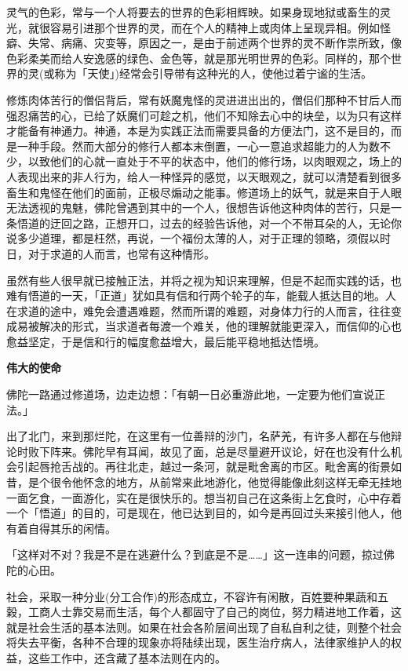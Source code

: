 \documentclass[twoside,openany]{book}
\newcommand{\mt}[1]{\textbullet \textbf{#1}}
\begin{document}
灵气的色彩，常与一个人将要去的世界的色彩相辉映。如果身现地狱或畜生的灵光，就很容易引进那个世界的灵，而在个人的精神上或肉体上呈现异相。例如怪癖、失常、病痛、灾变等，原因之一，是由于前述两个世界的灵不断作祟所致，像色彩柔美而给人安逸感的绿色、金色等，就是那光明世界的色彩。同样的，那个世界的灵(或称为「天使」)经常会引导带有这种光的人，使他过着宁谧的生活。

修炼肉体苦行的僧侣背后，常有妖魔鬼怪的灵进进出出的，僧侣们那种不甘后人而强忍痛苦的心，已给了妖魔们可趁之机，他们不知除去心中的块垒，以为只有这样才能备有神通力。神通，本是为实践正法而需要具备的方便法门，这不是目的，而是一种手段。然而大部分的修行人都本末倒置，一心一意追求超能力的人为数不少，以致他们的心就一直处于不平的状态中，他们的修行场，以肉眼观之，场上的人表现出来的非人行为，给人一种怪异的感觉，以天眼观之，就可以清楚看到很多畜生和鬼怪在他们的面前，正极尽煽动之能事。修道场上的妖气，就是来自于人眼无法透视的鬼魅，佛陀曾遇到其中的一个人，很想告诉他这种肉体的苦行，只是一条悟道的迂回之路，正想开口，过去的经验告诉他，对一个不带耳朵的人，无论你说多少道理，都是枉然，再说，一个福份太薄的人，对于正理的领略，须假以时日，对于求道的人而言，也常有这种情形。

虽然有些人很早就已接触正法，并将之视为知识来理解，但是不起而实践的话，也难有悟道的一天，「正道」犹如具有信和行两个轮子的车，能载人抵达目的地。人在求道的途中，难免会遭遇难题，然而所谓的难题，对身体力行的人而言，往往变成易被解决的形式，当求道者每渡一个难关，他的理解就能更深入，而信仰的心也愈益坚定，于是信和行的幅度愈益增大，最后能平稳地抵达悟境。

\mt{伟大的使命}

佛陀一路通过修道场，边走边想：「有朝一日必重游此地，一定要为他们宣说正法。」

出了北门，来到那烂陀，在这里有一位善辩的沙门，名萨羌，有许多人都在与他辩论时败下阵来。佛陀早有耳闻，故见了面，总是尽量避开议论，好在也没有什么机会引起唇抢舌战的。再往北走，越过一条河，就是毗舍离的市区。毗舍离的街景如昔，是个很令他怀念的地方，从前常来此地游化，他觉得能像此刻这样无牵无挂地一面乞食，一面游化，实在是很快乐的。想当初自己在这条街上乞食时，心中存着一个「悟道」的目的，可是现在，他已达到目的，如今是再回过头来接引他人，他有着自得其乐的闲情。

「这样对不对？我是不是在逃避什么？到底是不是……」这一连串的问题，掠过佛陀的心田。

社会，采取一种分业(分工合作)的形态成立，不容许有闲散，百姓要种果蔬和五榖，工商人士靠交易而生活，每个人都固守了自己的岗位，努力精进地工作着，这就是社会生活的基本法则。如果在社会各阶层间出现了自私自利之徒，则整个社会将失去平衡，各种不合理的现象亦将陆续出现，医生治疗病人，法律家维护人的权益，这些工作中，还含藏了基本法则在内的。
\end{document}

